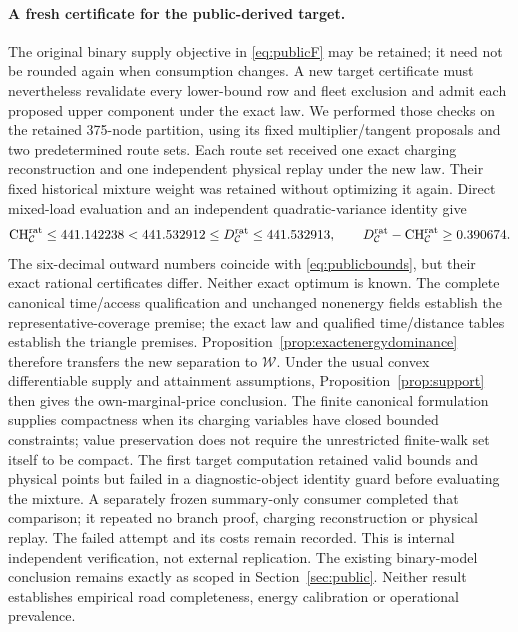 \paragraph{A fresh certificate for the public-derived target.}
The original binary supply objective in \eqref{eq:publicF} may be retained;
it need not be rounded again when consumption changes. A new target
certificate must nevertheless revalidate every lower-bound row and fleet
exclusion and admit each proposed upper component under the exact law.
We performed those checks on the retained 375-node partition, using its
fixed multiplier/tangent proposals and two predetermined route sets.
Each route set received one exact charging reconstruction and one independent
physical replay under the new law. Their fixed historical mixture weight
was retained without optimizing it again. Direct mixed-load evaluation and
an independent quadratic-variance identity give
\begin{equation}\label{eq:exacttargetbounds}
 \mathrm{CH}_{\mathcal C}^{\rm rat}\le441.142238<441.532912
 \le D_{\mathcal C}^{\rm rat}\le441.532913,
 \qquad D_{\mathcal C}^{\rm rat}-\mathrm{CH}_{\mathcal C}^{\rm rat}\ge0.390674.
\end{equation}
The six-decimal outward numbers coincide with \eqref{eq:publicbounds},
but their exact rational certificates differ. Neither exact optimum is known.
The complete canonical time/access qualification and unchanged nonenergy
fields establish the representative-coverage premise; the exact law and
qualified time/distance tables establish the triangle premises.
Proposition~\ref{prop:exactenergydominance} therefore transfers the new
separation to $\mathcal W$. Under the usual convex
differentiable supply and attainment assumptions,
Proposition~\ref{prop:support} then gives the own-marginal-price conclusion.
The finite canonical formulation supplies compactness when its charging
variables have closed bounded constraints; value preservation does not
require the unrestricted finite-walk set itself to be compact.
The first target computation retained valid bounds and physical points but
failed in a diagnostic-object identity guard before evaluating the mixture.
A separately frozen summary-only consumer completed that comparison; it
repeated no branch proof, charging reconstruction or physical replay. The
failed attempt and its costs remain recorded. This is internal independent
verification, not external replication. The existing binary-model conclusion
remains exactly as scoped in Section~\ref{sec:public}.
Neither result establishes empirical road completeness,
energy calibration or operational prevalence.
